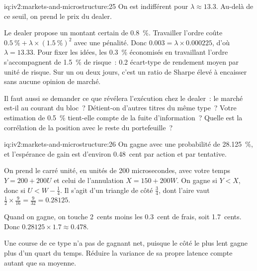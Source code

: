 \begin{solution}{iq:iv2:markets-and-microstructure:25}
On est indifférent pour $\lambda \approx 13.3$. Au-delà de ce seuil, on prend le prix du dealer.

Le dealer propose un montant certain de 0.8~\%. Travailler l'ordre coûte $0.5~\% + \lambda \times (1.5~\%)^2$ avec une pénalité. Donc $0.003 = \lambda \times 0.000225$, d'où $\lambda = 13.33$. Pour fixer les idées, les 0.3~\% économisés en travaillant l'ordre s'accompagnent de 1.5~\% de risque~: 0.2 écart-type de rendement moyen par unité de risque. Sur un ou deux jours, c'est un ratio de Sharpe élevé à encaisser sans aucune opinion de marché.

Il faut aussi se demander ce que révélera l'exécution chez le dealer~: le marché est-il au courant du bloc~? Détient-on d'autres titres du même type~? Votre estimation de 0.5~\% tient-elle compte de la fuite d'information~? Quelle est la corrélation de la position avec le reste du portefeuille~?

\end{solution}

\begin{solution}{iq:iv2:markets-and-microstructure:26}
On gagne avec une probabilité de 28.125~\%, et l'espérance de gain est d'environ 0.48~cent par action et par tentative.

On prend le carré unité, en unités de 200 microsecondes, avec votre temps $Y = 200 + 200U$ et celui de l'annulation $X = 150 + 200W$. On gagne si $Y < X$, donc si $U < W - \tfrac14$. Il s'agit d'un triangle de côté $\tfrac34$, dont l'aire vaut $\tfrac12 \times \tfrac{9}{16} = \tfrac{9}{32} = 0.28125$.

Quand on gagne, on touche 2~cents moins les 0.3~cent de frais, soit 1.7~cents. Donc $0.28125 \times 1.7 \approx 0.478$.

Une course de ce type n'a pas de gagnant net, puisque le côté le plus lent gagne plus d'un quart du temps. Réduire la variance de sa propre latence compte autant que sa moyenne.

\end{solution}

